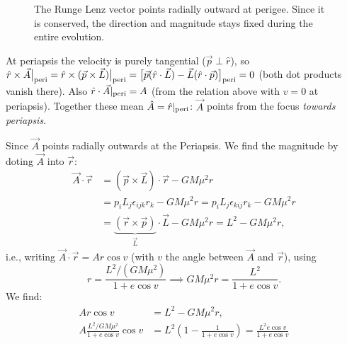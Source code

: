 \documentclass[11pt]{article}
\newcommand{\vecr}{\vec r}
\newcommand{\vecL}{\vec L}
\newcommand{\vecA}{\vec A}
\newcommand{\vecp}{\vec p}
\newcommand{\rhat}{\hat r}
\begin{document}
\begin{figure}[H]
	\caption{The Runge Lenz vector points radially outward at perigee. Since it is conserved, the direction and magnitude stays fixed during the entire evolution.}
\end{figure}
At periapsis the velocity is purely tangential ($\vecp\perp\rhat$), so $\rhat\times\vecA\big|_{\rm peri}=\rhat\times(\vecp\times\vecL)\big|_{\rm peri}=\big[\vecp(\rhat\cdot\vecL)-\vecL(\rhat\cdot\vecp)\big]_{\rm peri}=0$ (both dot products vanish there). Also $\rhat\cdot\vecA|_{\rm peri}=A$ (from the relation above with $v=0$ at periapsis). Together these mean $\hat A = \rhat|_{\rm peri}$: $\vecA$ points from the focus \emph{towards periapsis}.

Since $\vecA$ points radially outwards at the Periapsis. We find the magnitude by doting $\vecA$ into $\vecr$:
\begin{align}
    \vecA\cdot\vecr &= (\vecp\times\vecL)\cdot\vecr - GM\mu^2 r \\
    &=p_i L_j \epsilon_{ijk}r_k-GM\mu^2 r=p_i L_j \epsilon_{kij}r_k-GM\mu^2 r\\
    &= \underbrace{(\vecr\times\vecp)}_{\vecL}\cdot\vecL - GM\mu^2 r = L^2 - GM\mu^2 r,\end{align}
i.e., writing $\vecA\cdot\vecr = Ar\cos v$ (with $v$ the angle between $\vecA$ and $\vecr$), using
\[
r = \frac{L^2/(GM\mu^2)}{1+e\cos v}\implies GM\mu^2 r = \frac{L^2}{1+e\cos v}.
\]
We find:
\begin{align}
	Ar\cos v&=L^2 - GM\mu^2 r,\\
	A \frac{L^2/GM\mu^2}{1+e\cos v}\cos v&=L^2\left(1-\frac{1}{1+e\cos v}\right)=\frac{L^2e\cos v}{1+e\cos v}
\end{align}
\end{document}
